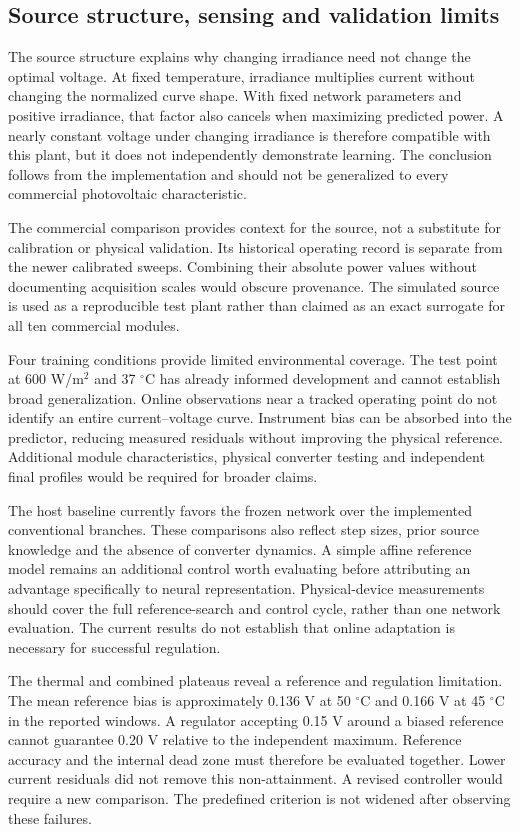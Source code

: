 \documentclass[Acad.Energy.,researcharticle,9pt,twoside,oneauthor]{Definitions/jams_academia}
\begin{document}
\subsection{Source structure, sensing and validation limits}
The source structure explains why changing irradiance need not change the optimal voltage. At fixed temperature, irradiance multiplies current without changing the normalized curve shape. With fixed network parameters and positive irradiance, that factor also cancels when maximizing predicted power. A nearly constant voltage under changing irradiance is therefore compatible with this plant, but it does not independently demonstrate learning. The conclusion follows from the implementation and should not be generalized to every commercial photovoltaic characteristic.

The commercial comparison provides context for the source, not a substitute for calibration or physical validation. Its historical operating record is separate from the newer calibrated sweeps. Combining their absolute power values without documenting acquisition scales would obscure provenance. The simulated source is used as a reproducible test plant rather than claimed as an exact surrogate for all ten commercial modules.

Four training conditions provide limited environmental coverage. The test point at 600 W/m$^2$ and 37 $^\circ$C has already informed development and cannot establish broad generalization. Online observations near a tracked operating point do not identify an entire current--voltage curve. Instrument bias can be absorbed into the predictor, reducing measured residuals without improving the physical reference. Additional module characteristics, physical converter testing and independent final profiles would be required for broader claims.

The host baseline currently favors the frozen network over the implemented conventional branches. These comparisons also reflect step sizes, prior source knowledge and the absence of converter dynamics. A simple affine reference model remains an additional control worth evaluating before attributing an advantage specifically to neural representation. Physical-device measurements should cover the full reference-search and control cycle, rather than one network evaluation. The current results do not establish that online adaptation is necessary for successful regulation.

The thermal and combined plateaus reveal a reference and regulation limitation. The mean reference bias is approximately 0.136 V at 50 $^\circ$C and 0.166 V at 45 $^\circ$C in the reported windows. A regulator accepting 0.15 V around a biased reference cannot guarantee 0.20 V relative to the independent maximum. Reference accuracy and the internal dead zone must therefore be evaluated together. Lower current residuals did not remove this non-attainment. A revised controller would require a new comparison. The predefined criterion is not widened after observing these failures.
\end{document}
